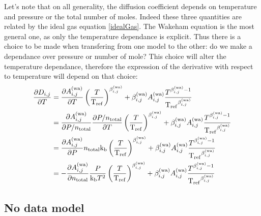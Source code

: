 %
Let's note that on all generality, the diffusion coefficient depends
on temperature and pressure or the total number of moles. Indeed these
three quantities are related by the ideal gas equation \eqref{idealGas}. The
Wakeham equation is the most general one, as only the temperature dependance
is explicit. Thus there is a choice to be made when transfering from one
model to the other: do we make a dependance over pressure or number of mole?
This choice will alter the temperature dependance, therefore the expression of
the derivative
with respect to temperature will depend on that choice:
\begin{equation}
\begin{split}
\frac{\partial D_{i,j}}{\partial T}  & = \frac{\partial A_{i,j}^{\text{(wa)}}}{\partial T} \left(\frac{T}{\mathrm{T_{ref}}}\right)^{\beta_{i,j}^{\text{(wa)}}} + \beta_{i,j}^{\text{(wa)}}A_{i,j}^{\text{(wa)}}\frac{T^{\beta_{i,j}^{\text{(wa)}} - 1}}{\mathrm{T_{ref}}^{\beta_{i,j}^{\text{(wa)}}}} \\
                         & = \frac{\partial A_{i,j}^{\text{(wa)}}}{\partial P/n_\text{total}}\frac{\partial P/n_\text{total}}{\partial T} \left(\frac{T}{\mathrm{T_{ref}}}\right)^{\beta_{i,j}^{\text{(wa)}}} + \beta_{i,j}^{\text{(wa)}}A_{i,j}^{\text{(wa)}}\frac{T^{\beta_{i,j}^{\text{(wa)}} - 1}}{\mathrm{T_{ref}}^{\beta_{i,j}^{\text{(wa)}}}} \\
                         & = \frac{\partial A_{i,j}^{\text{(wa)}}}{\partial P}n_\text{total}\text{k}_\text{b} \left(\frac{T}{\mathrm{T_{ref}}}\right)^{\beta_{i,j}^{\text{(wa)}}} + \beta_{i,j}^{\text{(wa)}}A_{i,j}^{\text{(wa)}}\frac{T^{\beta_{i,j}^{\text{(wa)}} - 1}}{\mathrm{T_{ref}}^{\beta_{i,j}^{\text{(wa)}}}} \\
                         & = - \frac{\partial A_{i,j}^{\text{(wa)}}}{\partial n_\text{total}}\frac{P}{\text{k}_\text{b} T^2} \left(\frac{T}{\mathrm{T_{ref}}}\right)^{\beta_{i,j}^{\text{(wa)}}} + \beta_{i,j}^{\text{(wa)}}A_{i,j}^{\text{(wa)}}\frac{T^{\beta_{i,j}^{\text{(wa)}} - 1}}{\mathrm{T_{ref}}^{\beta_{i,j}^{\text{(wa)}}}} \\
\end{split}
\label{Titan:dD_dT_details}
\end{equation}

\subsection{No data model}


